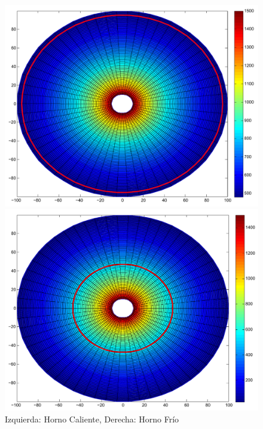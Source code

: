 \begin{figure}[!htb]
    \caption{Izquierda: Horno Caliente, Derecha: Horno Frío}
    \label{exp1-hfhc}
\centering
{}

  \includegraphics[width=1\textwidth]{figures/calor-isoterma-mn19.pdf}

\endminipage\hfill
{}

  \includegraphics[width=1\textwidth]{figures/frio-isoterma-mn19.pdf}

\endminipage\hfill
\end{figure}

